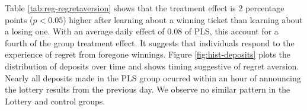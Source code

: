 \documentclass[11pt]{article}
\begin{document}
		Table \ref{tab:reg-regretaversion} shows that the treatment effect is 2 percentage points ($p<0.05$) higher after learning about a winning ticket than learning about a losing one. With an average daily effect of 0.08 of PLS, this account for a fourth of the group treatment effect. It suggests that individuals respond to the experience of regret from foregone winnings. Figure \ref{fig:hist-deposits} plots the distribution of deposits over time and shows timing suggestive of regret aversion. Nearly all deposits made in the PLS group ocurred within an hour of announcing the lottery results from the previous day. We observe no similar pattern in the Lottery and control groups.

		

		\clearpage




\end{document}
